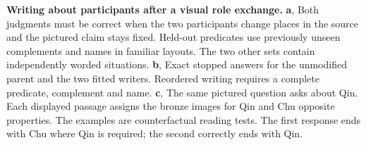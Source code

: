 \textbf{Writing about participants after a visual role exchange.}
\textbf{a}, Both judgments must be correct when the two participants change places in the source and the pictured claim stays fixed. Held-out predicates use previously unseen complements and names in familiar layouts. The two other sets contain independently worded situations.
\textbf{b}, Exact stopped answers for the unmodified parent and the two fitted writers. Reordered writing requires a complete predicate, complement and name.
\textbf{c}, The same pictured question asks about Qin. Each displayed passage assigns the bronze images for Qin and Chu opposite properties. The examples are counterfactual reading tests. The first response ends with Chu where Qin is required; the second correctly ends with Qin.
